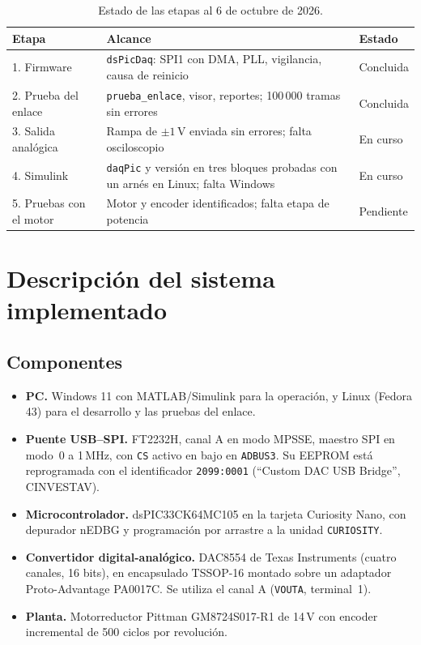 \documentclass[11pt]{article}
\newcommand{\code}[1]{\texttt{#1}}
\begin{document}
\begin{table}[H]
\centering
\small
\begin{tabularx}{\linewidth}{@{}lXl@{}}
\toprule
Etapa & Alcance & Estado \\
\midrule
1. Firmware & \code{dsPicDaq}: SPI1 con DMA, PLL, vigilancia, causa de reinicio & Concluida \\
2. Prueba del enlace & \code{prueba\_enlace}, visor, reportes; 100\,000 tramas sin errores & Concluida \\
3. Salida analógica & Rampa de $\pm1$\,V enviada sin errores; falta osciloscopio & En curso \\
4. Simulink & \code{daqPic} y versión en tres bloques probadas con un arnés en Linux; falta Windows & En curso \\
5. Pruebas con el motor & Motor y encoder identificados; falta etapa de potencia & Pendiente \\
\bottomrule
\end{tabularx}
\caption{Estado de las etapas al 6 de octubre de 2026.}
\label{tab:etapas}
\end{table}

\section{Descripción del sistema implementado}

\subsection{Componentes}

\begin{itemize}
\item \textbf{PC.} Windows 11 con MATLAB/Simulink para la operación, y Linux
  (Fedora 43) para el desarrollo y las pruebas del enlace.
\item \textbf{Puente USB--SPI.} FT2232H, canal A en modo MPSSE, maestro SPI en
  modo~0 a 1\,MHz, con \code{CS} activo en bajo en \code{ADBUS3}. Su EEPROM
  está reprogramada con el identificador \code{2099:0001} (``Custom DAC USB
  Bridge'', CINVESTAV).
\item \textbf{Microcontrolador.} dsPIC33CK64MC105 en la tarjeta Curiosity
  Nano, con depurador nEDBG y programación por arrastre a la unidad
  \code{CURIOSITY}.
\item \textbf{Convertidor digital-analógico.} DAC8554 de Texas Instruments
  (cuatro canales, 16 bits), en encapsulado TSSOP-16 montado sobre un
  adaptador Proto-Advantage PA0017C. Se utiliza el canal A (\code{VOUTA},
  terminal~1).
\item \textbf{Planta.} Motorreductor Pittman GM8724S017-R1 de 14\,V con
  encoder incremental de 500 ciclos por revolución.
\end{itemize}
\end{document}
